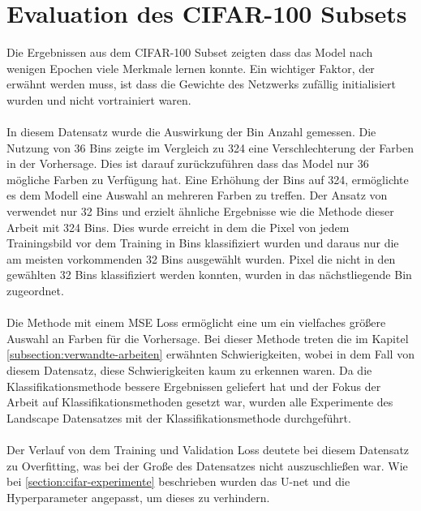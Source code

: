 \section{Evaluation des CIFAR-100 Subsets}
Die Ergebnissen aus dem CIFAR-100 Subset zeigten dass das Model nach wenigen Epochen viele Merkmale lernen konnte. Ein wichtiger Faktor, der 
erwähnt werden muss, ist dass die Gewichte des Netzwerks zufällig initialisiert wurden und nicht vortrainiert waren. 
\\
\\
In diesem Datensatz wurde die Auswirkung der Bin Anzahl gemessen. Die Nutzung von 36 Bins zeigte im Vergleich zu 324 eine 
Verschlechterung der Farben in der Vorhersage. Dies ist darauf zurückzuführen dass das Model nur 36 mögliche Farben zu Verfügung hat.
Eine Erhöhung der Bins auf 324, ermöglichte es dem Modell eine Auswahl an mehreren Farben zu treffen. 
Der Ansatz von \cite{billaut2018colorunet} verwendet nur 32 Bins und erzielt ähnliche Ergebnisse wie die Methode dieser Arbeit mit 324 Bins.
Dies wurde erreicht in dem die Pixel von jedem Trainingsbild vor dem Training in Bins klassifiziert wurden und daraus nur die am meisten
vorkommenden 32 Bins ausgewählt wurden. Pixel die nicht in den gewählten 32 Bins klassifiziert werden konnten, wurden in das nächstliegende Bin
zugeordnet.
\\
\\
Die Methode mit einem MSE Loss ermöglicht eine um ein vielfaches größere Auswahl an Farben für die Vorhersage. Bei dieser Methode treten 
die im Kapitel \ref{subsection:verwandte-arbeiten} erwähnten Schwierigkeiten, wobei in dem Fall von diesem Datensatz, diese Schwierigkeiten
kaum zu erkennen waren. %
Da die Klassifikationsmethode bessere Ergebnissen geliefert hat und der Fokus der Arbeit auf Klassifikationsmethoden gesetzt war,
wurden alle Experimente des Landscape Datensatzes mit der Klassifikationsmethode durchgeführt.
\\
\\
Der Verlauf von dem Training und Validation Loss deutete bei diesem Datensatz zu Overfitting, was bei der Große des Datensatzes nicht auszuschließen war.
Wie bei \ref{section:cifar-experimente} beschrieben wurden das U-net und die Hyperparameter angepasst, um dieses zu verhindern.

